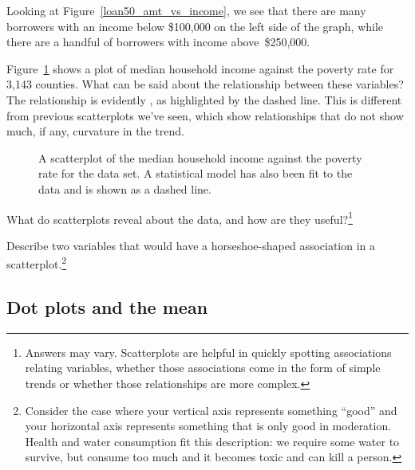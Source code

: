 
Looking at Figure~\ref{loan50_amt_vs_income},
we see that there are many borrowers with an income below
\$100,000 on the left side of the graph,
while there are a handful of borrowers with income above~\$250,000.

\begin{example}{Figure~\ref{medianHHIncomePoverty}
    shows a plot of median household income
    against the poverty rate for 3,143 counties.
    What can be said about the relationship between
    these variables?}
  The relationship is evidently ,
  as highlighted by the dashed line.
  This is different from previous scatterplots we've seen,
  which show relationships that do not show much, if any,
  curvature in the trend.
\end{example}

\begin{figure}[h]
  \centering
  \caption{A scatterplot of the median household income
      against the poverty rate for the
       data set.
      A statistical model has also been fit to the data
      and is shown as a dashed line.}
  \label{medianHHIncomePoverty}
\end{figure}

\begin{exercise}
What do scatterplots reveal about the data,
and how are they useful?\footnote{Answers may vary.
Scatterplots are helpful in quickly spotting associations
relating variables,
whether those associations come in the form of simple
trends or whether those relationships are more complex.}
\end{exercise}

\begin{exercise}
Describe two variables that would have a horseshoe-shaped
association in a scatterplot.\footnote{Consider the case
  where your vertical axis represents something ``good'' and
  your horizontal axis represents something that is only good
  in moderation.
  Health and water consumption fit this description: we require
  some water to survive, but consume too much and it becomes
  toxic and can kill a person.}
\end{exercise}

\subsection{Dot plots and the mean}
\label{dotPlot}

